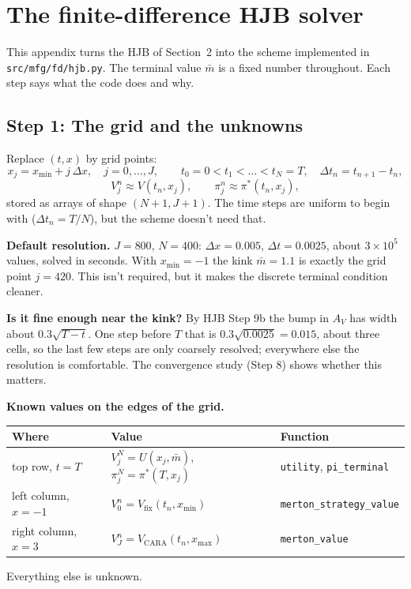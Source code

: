 \documentclass[11pt]{article}
\newcommand{\mb}{\bar m}
\begin{document}
\appendix
\section{The finite-difference HJB solver}
\label{app:fd-hjb}

This appendix turns the HJB of Section~2 into the scheme implemented in
\texttt{src/mfg/fd/hjb.py}. The terminal value $\mb$ is a fixed number throughout. Each step
says what the code does and why.

\subsection*{Step 1: The grid and the unknowns}
Replace $(t,x)$ by grid points:
\[
  x_j = x_{\min} + j\,\Delta x,\quad j=0,\dots,J,\qquad
  t_0=0<t_1<\dots<t_N=T,\quad \Delta t_n = t_{n+1}-t_n ,
\]
\[
  V_j^n \approx V(t_n,x_j),\qquad \pi_j^n \approx \pi^*(t_n,x_j),
\]
stored as arrays of shape $(N+1,J+1)$. The time steps are uniform to begin with
($\Delta t_n=T/N$), but the scheme doesn't need that.

\textbf{Default resolution.} $J=800$, $N=400$: $\Delta x=0.005$, $\Delta t=0.0025$, about
$3\times10^5$ values, solved in seconds. With $x_{\min}=-1$ the kink $\mb=1.1$ is exactly the
grid point $j=420$. This isn't required, but it makes the discrete terminal condition
cleaner.

\textbf{Is it fine enough near the kink?} By HJB Step 9b the bump in $A_V$ has width about
$0.3\sqrt{T-t}$. One step before $T$ that is $0.3\sqrt{0.0025}=0.015$, about three cells, so
the last few steps are only coarsely resolved; everywhere else the resolution is
comfortable. The convergence study (Step 8) shows whether this matters.

\textbf{Known values on the edges of the grid.}
\begin{center}
\begin{tabular}{@{}lll@{}}
\toprule
Where & Value & Function \\
\midrule
top row, $t=T$ & $V_j^N = U(x_j,\mb)$, $\pi_j^N=\pi^*(T,x_j)$ & \texttt{utility}, \texttt{pi\_terminal} \\
left column, $x=-1$ & $V_0^n = V_{\text{fix}}(t_n,x_{\min})$ & \texttt{merton\_strategy\_value} \\
right column, $x=3$ & $V_J^n = V_{\text{CARA}}(t_n,x_{\max})$ & \texttt{merton\_value} \\
\bottomrule
\end{tabular}
\end{center}
Everything else is unknown.
\end{document}
